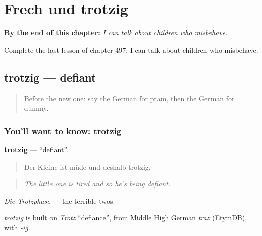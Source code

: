 
\chapter{Frech und trotzig}
\label{ch:ge-frech-und-trotzig}

\begin{chapteropening}
\textbf{By the end of this chapter:} \emph{I can talk about children who misbehave.}

Complete the last lesson of chapter 497: I can talk about children who misbehave.
\end{chapteropening}

\section[trotzig]{trotzig — defiant}

\label{lesson:GE-C497-trotzig}



\begin{quote}
Before the new one: say the German for pram, then the German for dummy.
\end{quote}

\subsection*{You'll want to know: trotzig}
\textbf{trotzig} — \textquotedblleft{}defiant\textquotedblright{}.

\begin{quote}
Der Kleine ist müde und deshalb trotzig.
\end{quote}

\begin{quote}
\emph{The little one is tired and so he's being defiant.}
\end{quote}

\emph{Die Trotzphase} — the terrible twos.

\begin{cousinweb}
\emph{trotzig} is built on \emph{Trotz} \textquotedblleft{}defiance\textquotedblright{}, from Middle High German \emph{traz} (EtymDB), with \emph{-ig}.
\end{cousinweb}

